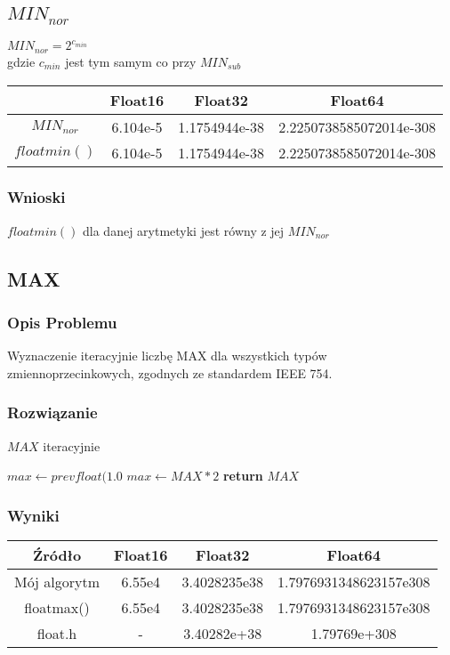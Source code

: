 \documentclass{article}
\begin{document}
\subsection{$MIN_{nor}$}
    $MIN_{nor} = 2^{c_{min}}$\\
    gdzie $c_{min}$ jest tym samym co przy $MIN_{sub}$ 
        \begin{center}
        \begin{tabular}{|c|c|c|c|}
        \hline
             & Float16 & Float32 & Float64 \\
            \hline
            $MIN_{nor}$ & 6.104e-5 & 1.1754944e-38 & 2.2250738585072014e-308\\
            \hline
            $floatmin()$ & 6.104e-5 & 1.1754944e-38 & 2.2250738585072014e-308\\
        \hline
        \end{tabular}
    \end{center}
\subsubsection{Wnioski}
     $floatmin()$ dla danej arytmetyki jest równy z jej $MIN_{nor}$

\subsection{MAX}
\subsubsection{Opis Problemu}
    Wyznaczenie iteracyjnie liczbę MAX dla wszystkich typów zmiennoprzecinkowych, zgodnych ze standardem IEEE 754.
\subsubsection{Rozwiązanie}
    \begin{algorithm}
    \caption{$MAX$ iteracyjnie}\label{alg:cap}
    \begin{algorithmic}
        \State $max \gets prevfloat(1.0$
            \State $max \gets MAX * 2$
        \EndWhile
        \State \textbf{return} $MAX$
    \end{algorithmic}
    \end{algorithm}
\subsubsection{Wyniki}
    \begin{center}
        \begin{tabular}{|c||c|c|c|}
        \hline
            Źródło & Float16 & Float32 & Float64\\
            \hline\hline
            Mój algorytm & 6.55e4 & 3.4028235e38 & 1.7976931348623157e308\\
            \hline
            floatmax() & 6.55e4 & 3.4028235e38 & 1.7976931348623157e308\\
            \hline
            float.h & - & 3.40282e+38 & 1.79769e+308\\
        \hline
        \end{tabular}
    \end{center}
\end{document}
